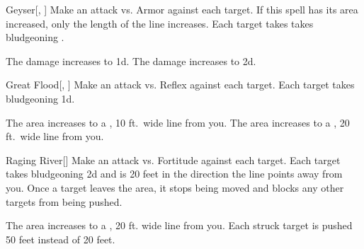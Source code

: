 \lowercase{\hypertarget{spell:Geyser}{}}\label{spell:Geyser}
\begin{freeability}[Rank 3]{\hypertarget{spell:Geyser}{Geyser}}[, ]
Make an attack vs. Armor against each target.
If this spell has its area increased, only the length of the line increases.
\hit Each target takes takes bludgeoning .

\rankline
{} The damage increases to  \plus1d.
 The damage increases to  \plus2d.

\end{freeability}
\vspace{0.25em}



\lowercase{\hypertarget{spell:Great Flood}{}}\label{spell:Great Flood}
\begin{freeability}[Rank 3]{\hypertarget{spell:Great Flood}{Great Flood}}[, ]
Make an attack vs. Reflex against each target.
\hit Each target takes bludgeoning  \minus1d.

\rankline
{} The area increases to a \areahuge, 10 ft.\ wide line from you.
 The area increases to a \areahuge, 20 ft.\ wide line from you.

\end{freeability}
\vspace{0.25em}



\lowercase{\hypertarget{spell:Raging River}{}}\label{spell:Raging River}
\begin{freeability}[Rank 3]{\hypertarget{spell:Raging River}{Raging River}}[]
Make an attack vs. Fortitude against each target.
\hit Each target takes bludgeoning  \minus2d and is  20 feet in the direction the line points away from you.
Once a target leaves the area, it stops being moved and blocks any other targets from being pushed.

\rankline
 The area increases to a \areahuge, 20 ft. wide line from you.
 Each struck target is pushed 50 feet instead of 20 feet.

\end{freeability}
\vspace{0.25em}




